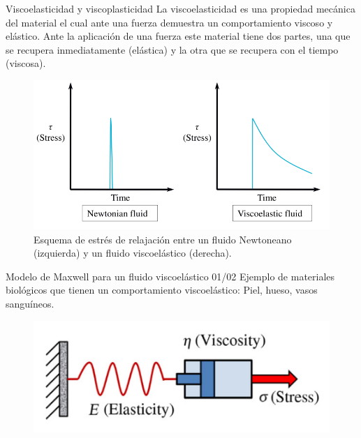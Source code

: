 \begin{frame}{Viscoelasticidad y viscoplasticidad}
\justifying
La viscoelasticidad es una propiedad mecánica del material el cual ante una fuerza demuestra un comportamiento viscoso y elástico. Ante la aplicación de una fuerza este material tiene dos partes, una que se recupera inmediatamente (elástica) y la otra que se recupera con el tiempo (viscosa).
\begin{figure}[H]
\centering
\includegraphics[scale=0.4]{Section_Files/S2-imagenes-Manuel/18.png}
\caption{Esquema de estrés de relajación entre un fluido Newtoneano (izquierda) y un fluido viscoelástico (derecha).}
\end{figure}
\end{frame}

\begin{frame}{Modelo de Maxwell para un fluido viscoelástico 01/02}
\justifying
Ejemplo de materiales biológicos que tienen un comportamiento viscoelástico: Piel, hueso, vasos sanguíneos.
\begin{figure}[H]
\centering
\includegraphics[scale=0.4]{Section_Files/S2-imagenes-Manuel/19.png}
\end{figure}
\end{frame}

